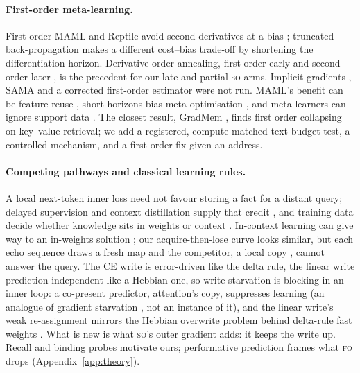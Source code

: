 \documentclass[11pt]{article}
\newcommand{\FO}{\textsc{fo}}
\newcommand{\SO}{\textsc{so}}
\begin{document}
\paragraph{First-order meta-learning.}
First-order MAML and Reptile avoid second derivatives \citep{finn2017maml,nichol2018firstorder} at a
bias \citep{fallah2020convergence}; truncated back-propagation \citep{shaban2019truncated} makes a different
cost--bias trade-off by shortening the differentiation horizon. Derivative-order annealing, first order
early and second order later
\citep{antoniou2019maml}, is the precedent for our late and partial \SO{} arms. Implicit gradients
\citep{rajeswaran2019imaml}, SAMA \citep{choe2023sama} and a corrected first-order estimator
\citep{chayti2026fobmaml} were not run. MAML's benefit can be feature reuse
\citep{raghu2020anil}, short horizons bias meta-optimisation \citep{wu2018shorthorizon}, and
meta-learners can ignore support data \citep{yin2020memorization}. The closest result, GradMem
\citep{kuratov2026gradmem}, finds first order collapsing on key--value retrieval; we add a
registered, compute-matched text budget test, a controlled mechanism, and a first-order fix given an
address.

\paragraph{Competing pathways and classical learning rules.}
A local next-token inner loss need not favour storing a fact for a distant query; delayed supervision
and context distillation supply that credit \citep{kim2026delayed,wang2026ttcd}, and training
data decide whether knowledge sits in weights or context
\citep{kim2025trainingdata,uzunoglu2026abundance}. In-context learning can give way to an in-weights
solution \citep{singh2023transient}; our acquire-then-lose curve looks similar, but each echo sequence
draws a fresh map and the competitor, a local copy \citep{olsson2022induction}, cannot answer the
query. The CE write is error-driven like the delta rule, the linear write prediction-independent
like a Hebbian one, so write starvation is blocking in an inner loop: a co-present predictor,
attention's copy, suppresses learning \citep{kamin1969predictability,rescorla1972theory} (an analogue
of gradient starvation \citep{pezeshki2021gradient}, not an instance of it), and the linear write's
weak re-assignment mirrors the Hebbian overwrite problem behind delta-rule fast weights
\citep{schlag2021linear}. What is new is what \SO's outer gradient adds: it keeps the write up.
Recall \citep{arora2023zoology} and binding \citep{ravulapalli2026binding,ravulapalli2026legible}
probes motivate ours; performative prediction \citep{perdomo2020performative} frames what \FO{} drops
(Appendix~\ref{app:theory}).
\end{document}
